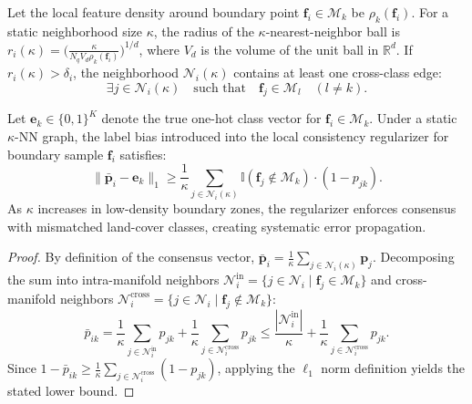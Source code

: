 \begin{lemma}
\label{lem:contamination}
Let the local feature density around boundary point $\bm{f}_i \in \mathcal{M}_k$ be $\rho_k(\bm{f}_i)$. For a static neighborhood size $\kappa$, the radius of the $\kappa$-nearest-neighbor ball is $r_i(\kappa) = \big(\frac{\kappa}{N_q V_d \rho_k(\bm{f}_i)}\big)^{1/d}$, where $V_d$ is the volume of the unit ball in $\mathbb{R}^d$. If $r_i(\kappa) > \delta_i$, the neighborhood $\mathcal{N}_i(\kappa)$ contains at least one cross-class edge:
\begin{equation}
    \exists j \in \mathcal{N}_i(\kappa) \quad \text{such that} \quad \bm{f}_j \in \mathcal{M}_l \quad (l \neq k).
\end{equation}
\end{lemma}

\begin{theorem}
\label{thm:error_bound}
Let $\bm{e}_k \in \{0, 1\}^K$ denote the true one-hot class vector for $\bm{f}_i \in \mathcal{M}_k$. Under a static $\kappa$-NN graph, the label bias introduced into the local consistency regularizer for boundary sample $\bm{f}_i$ satisfies:
\begin{equation}
    \lVert \bar{\bm{p}}_i - \bm{e}_k \rVert_1 \ge \frac{1}{\kappa} \sum_{j \in \mathcal{N}_i(\kappa)} \mathbb{I}(\bm{f}_j \notin \mathcal{M}_k) \cdot (1 - p_{jk}).
\end{equation}
As $\kappa$ increases in low-density boundary zones, the regularizer enforces consensus with mismatched land-cover classes, creating systematic error propagation.
\end{theorem}

\begin{proof}
By definition of the consensus vector, $\bar{\bm{p}}_i = \frac{1}{\kappa} \sum_{j \in \mathcal{N}_i(\kappa)} \bm{p}_j$. Decomposing the sum into intra-manifold neighbors $\mathcal{N}_i^{\text{in}} = \{j \in \mathcal{N}_i \mid \bm{f}_j \in \mathcal{M}_k\}$ and cross-manifold neighbors $\mathcal{N}_i^{\text{cross}} = \{j \in \mathcal{N}_i \mid \bm{f}_j \notin \mathcal{M}_k\}$:
\begin{equation}
    \bar{p}_{ik} = \frac{1}{\kappa}\sum_{j \in \mathcal{N}_i^{\text{in}}} p_{jk} + \frac{1}{\kappa}\sum_{j \in \mathcal{N}_i^{\text{cross}}} p_{jk} \le \frac{|\mathcal{N}_i^{\text{in}}|}{\kappa} + \frac{1}{\kappa}\sum_{j \in \mathcal{N}_i^{\text{cross}}} p_{jk}.
\end{equation}
Since $1 - \bar{p}_{ik} \ge \frac{1}{\kappa}\sum_{j \in \mathcal{N}_i^{\text{cross}}} (1 - p_{jk})$, applying the $\ell_1$ norm definition yields the stated lower bound.
\end{proof}


